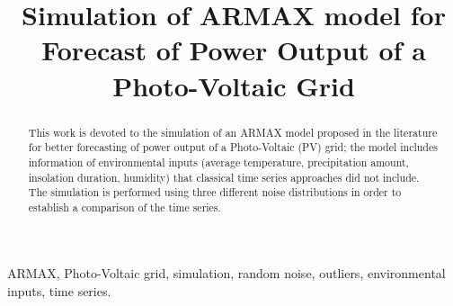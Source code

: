 \documentclass[conference]{IEEEtran}
\begin{document}
\title{Simulation of ARMAX model for Forecast of Power Output of a Photo-Voltaic Grid\\}

\author{
\and
{}
}

\maketitle

\begin{abstract}
This work is devoted to the simulation of an ARMAX model proposed in the literature for better forecasting of power output of a Photo-Voltaic (PV) grid; the model includes information of environmental inputs (average temperature, precipitation amount, insolation duration, humidity) that classical time series approaches did not include. The simulation is performed using three different noise distributions in order to establish a comparison of the time series.
\end{abstract}

\begin{IEEEkeywords}
ARMAX, Photo-Voltaic grid, simulation, random noise, outliers, environmental inputs, time series.
\end{IEEEkeywords}







\nocite{*}


\end{document}
